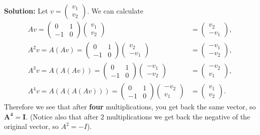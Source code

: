 \documentclass[11pt]{article}
\begin{document}
\begin{enumerate}
\begin{enumerate}
\textbf{Solution:} Let $v = \begin{pmatrix} v_1 \\ v_2 \end{pmatrix}$.  We can calculate
\begin{align*}
Av = \begin{pmatrix} 0 & 1 \\ -1 & 0 \end{pmatrix} \begin{pmatrix} v_1 \\ v_2 \end{pmatrix} &= \begin{pmatrix} v_2 \\ -v_1 \end{pmatrix}, \\
A^2v = A(Av) = \begin{pmatrix} 0 & 1 \\ -1 & 0 \end{pmatrix} \begin{pmatrix} v_2 \\ -v_1 \end{pmatrix} &= \begin{pmatrix} -v_1 \\ -v_2 \end{pmatrix}, \\
A^3v = A(A(Av)) = \begin{pmatrix} 0 & 1 \\ -1 & 0 \end{pmatrix} \begin{pmatrix} -v_1 \\ -v_2 \end{pmatrix} &= \begin{pmatrix} -v_2 \\ v_1 \end{pmatrix}, \\
A^4v = A(A(A(Av))) = \begin{pmatrix} 0 & 1 \\ -1 & 0 \end{pmatrix} \begin{pmatrix} -v_2 \\ v_1 \end{pmatrix} &= \begin{pmatrix} v_1 \\ v_2 \end{pmatrix}.
\end{align*}
Therefore we see that after \textbf{four} multiplications, you get back the same vector, so $\mathbf{A^4 = I}$.  (Notice also that after $2$ multiplications we get back the negative of the original vector, so $A^2 = -I$).



\end{enumerate}
\end{enumerate}
\end{document}

